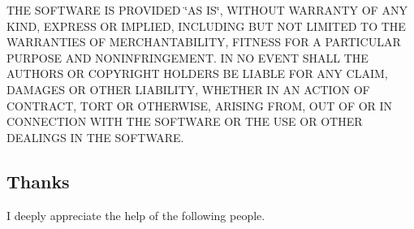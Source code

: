 T\+HE S\+O\+F\+T\+W\+A\+RE IS P\+R\+O\+V\+I\+D\+ED \char`\"{}\+A\+S I\+S\char`\"{}, W\+I\+T\+H\+O\+UT W\+A\+R\+R\+A\+N\+TY OF A\+NY K\+I\+ND, E\+X\+P\+R\+E\+SS OR I\+M\+P\+L\+I\+ED, I\+N\+C\+L\+U\+D\+I\+NG B\+UT N\+OT L\+I\+M\+I\+T\+ED TO T\+HE W\+A\+R\+R\+A\+N\+T\+I\+ES OF M\+E\+R\+C\+H\+A\+N\+T\+A\+B\+I\+L\+I\+TY, F\+I\+T\+N\+E\+SS F\+OR A P\+A\+R\+T\+I\+C\+U\+L\+AR P\+U\+R\+P\+O\+SE A\+ND N\+O\+N\+I\+N\+F\+R\+I\+N\+G\+E\+M\+E\+NT. IN NO E\+V\+E\+NT S\+H\+A\+LL T\+HE A\+U\+T\+H\+O\+RS OR C\+O\+P\+Y\+R\+I\+G\+HT H\+O\+L\+D\+E\+RS BE L\+I\+A\+B\+LE F\+OR A\+NY C\+L\+A\+IM, D\+A\+M\+A\+G\+ES OR O\+T\+H\+ER L\+I\+A\+B\+I\+L\+I\+TY, W\+H\+E\+T\+H\+ER IN AN A\+C\+T\+I\+ON OF C\+O\+N\+T\+R\+A\+CT, T\+O\+RT OR O\+T\+H\+E\+R\+W\+I\+SE, A\+R\+I\+S\+I\+NG F\+R\+OM, O\+UT OF OR IN C\+O\+N\+N\+E\+C\+T\+I\+ON W\+I\+TH T\+HE S\+O\+F\+T\+W\+A\+RE OR T\+HE U\+SE OR O\+T\+H\+ER D\+E\+A\+L\+I\+N\+GS IN T\+HE S\+O\+F\+T\+W\+A\+RE.

\subsection*{Thanks}

I deeply appreciate the help of the following people.


